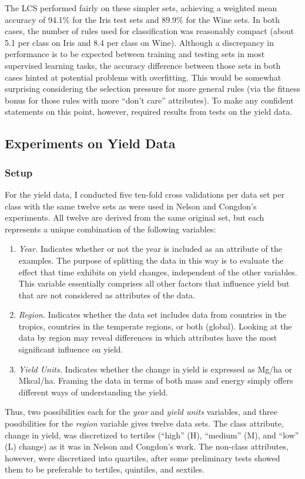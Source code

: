 \documentclass[11pt]{article}
\begin{document}
The LCS performed fairly on these simpler sets, achieving a weighted mean accuracy of 94.1\% for the Iris test sets and 89.9\% for the Wine sets. In both cases, the number of rules used for classification was reasonably compact (about 5.1 per class on Iris and 8.4 per class on Wine). Although a discrepancy in performance is to be expected between training and testing sets in most supervised learning tasks, the accuracy difference between those sets in both cases hinted at potential problems with overfitting. This would be somewhat surprising considering the selection pressure  for more general rules (via the fitness bonus for those rules with more ``don't care'' attributes). To make any confident statements on this point, however, required results from tests on the yield data.

\subsection{Experiments on Yield Data}

\subsubsection{Setup}
For the yield data, I conducted five ten-fold cross validations per data set per class with the same twelve sets as were used in Nelson and Congdon's experiments. All twelve are derived from the same original set, but each represents a unique combination of the following variables:
\begin{enumerate}
\item \textit{Year.} Indicates whether or not the year is included as an attribute of the examples. The purpose of splitting the data in this way is to evaluate the effect that time exhibits on yield changes, independent of the other variables. This variable essentially comprises all other factors that influence yield but that are not considered as attributes of the data.
\item \textit{Region.} Indicates whether the data set includes data from countries in the tropics, countries in the temperate regions, or both (global). Looking at the data by region may reveal differences in which attributes have the most significant influence on yield.
\item \textit{Yield Units.} Indicates whether the change in yield is expressed as Mg/ha or Mkcal/ha. Framing the data in terms of both mass and energy simply offers different ways of understanding the yield.
\end{enumerate}
Thus, two possibilities  each for the \textit{year} and \textit{yield units} variables, and three possibilities for the \textit{region} variable gives twelve data sets. The class attribute, change in yield, was discretized to tertiles (``high'' (H), ``medium'' (M), and ``low'' (L) change) as it was in Nelson and Congdon's work. The non-class attributes, however, were discretized into quartiles, after some preliminary tests showed them to be preferable to tertiles, quintiles, and sextiles.
\end{document}
